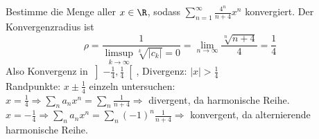 \begin{example}
    Bestimme die Menge aller $x\in \R$, sodass $\sum_{n=1}^\infty \frac{4^n}{n+4}x^n$ konvergiert.
    \tcblower
    Der Konvergenzradius ist
    \begin{equation*}
        \rho = \frac{1}{\limsup\limits_{k \to \infty} \sqrt[k]{|c_k|} = 0} = \lim_{n \to \infty} \frac{\sqrt[n]{n+4}}{4} = \frac{1}{4}
    \end{equation*}
    Also Konvergenz in $\left] -\frac{1}{4}, \frac{1}{4}\right[$, Divergenz: $|x| > \frac{1}{4}$\\
    Randpunkte: $x \pm \frac{1}{4}$ einzeln untersuchen:\\
    $x = \frac{1}{4} \Rightarrow \sum_n a_n x^n = \sum_n \frac{1}{n+4} \Rightarrow$ divergent, da harmonische Reihe.
    $x = - \frac{1}{4} \Rightarrow \sum_n a_n x^n = \sum_n (-1)^n \frac{1}{n+4} \Rightarrow$ konvergent, da alternierende harmonische Reihe.
\end{example}